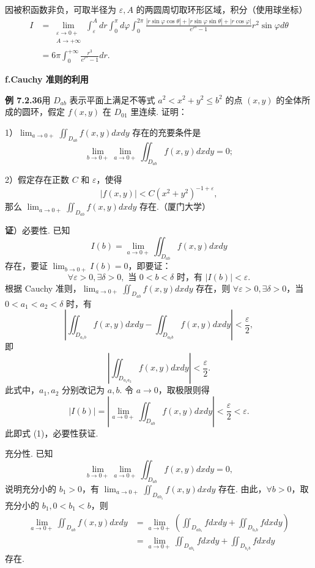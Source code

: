 \documentclass[UTF8,12pt,a4paper,fontset=fandol]{ctexart}
\begin{document}
因被积函数非负，可取半径为 $\varepsilon,A$ 的两圆周切取环形区域，积分（使用球坐标）
\[
\begin{aligned}
I&=\lim_{\substack{\varepsilon\to0+\\A\to+\infty}}
\int_\varepsilon^Adr\int_0^\pi d\varphi\int_0^{2\pi}
\frac{|r\sin\varphi\cos\theta|+|r\sin\varphi\sin\theta|+|r\cos\varphi|}
{e^{r^\alpha}-1}r^2\sin\varphi d\theta\\
&=6\pi\int_0^{+\infty}\frac{r^3}{e^{r^\alpha}-1}dr.
\end{aligned}
\]

\noindent\textbf{f.\quad Cauchy 准则的利用}

\noindent\textbf{例 7.2.36}\quad 用 $D_{ab}$ 表示平面上满足不等式 $a^2<x^2+y^2\le b^2$ 的点 $(x,y)$ 的全体所成的圆环，假定 $f(x,y)$ 在 $D_{01}$ 里连续. 证明：

1）$\displaystyle\lim_{a\to0+}\iint_{D_{ab}}f(x,y)dxdy$ 存在的充要条件是
\[
\lim_{b\to0+}\lim_{a\to0+}\iint_{D_{ab}}f(x,y)dxdy=0;
\]

2）假定存在正数 $C$ 和 $\varepsilon$，使得
\[
|f(x,y)|<C(x^2+y^2)^{-1+\varepsilon},
\]
那么 $\displaystyle\lim_{a\to0+}\iint_{D_{ab}}f(x,y)dxdy$ 存在.（厦门大学）

\noindent\textbf{证}）必要性. 已知
\[
I(b)=\lim_{a\to0+}\iint_{D_{ab}}f(x,y)dxdy
\]
存在，要证 $\lim_{b\to0+}I(b)=0$，即要证：
\[
\forall\varepsilon>0,\exists\delta>0,\text{ 当 }0<b<\delta\text{ 时，有 }|I(b)|<\varepsilon. \tag{1}
\]
根据 Cauchy 准则，$\displaystyle\lim_{a\to0+}\iint_{D_{ab}}f(x,y)dxdy$ 存在，则 $\forall\varepsilon>0,\exists\delta>0$，当 $0<a_1<a_2<\delta$ 时，有
\[
\left|\iint_{D_{a_1b}}f(x,y)dxdy-\iint_{D_{a_2b}}f(x,y)dxdy\right|<\frac\varepsilon2,
\]
即
\[
\left|\iint_{D_{a_1a_2}}f(x,y)dxdy\right|<\frac\varepsilon2.
\]
此式中，$a_1,a_2$ 分别改记为 $a,b$. 令 $a\to0$，取极限则得
\[
|I(b)|=\left|\lim_{a\to0+}\iint_{D_{ab}}f(x,y)dxdy\right|<\frac\varepsilon2<\varepsilon.
\]
此即式 (1)，必要性获证.

充分性. 已知
\[
\lim_{b\to0+}\lim_{a\to0+}\iint_{D_{ab}}f(x,y)dxdy=0,
\]
说明充分小的 $b_1>0$，有 $\displaystyle\lim_{a\to0+}\iint_{D_{ab_1}}f(x,y)dxdy$ 存在. 由此，$\forall b>0$，取充分小的 $b_1,0<b_1<b$，则
\[
\begin{aligned}
\lim_{a\to0+}\iint_{D_{ab}}f(x,y)dxdy
&=\lim_{a\to0+}\left(\iint_{D_{ab_1}}fdxdy+\iint_{D_{b_1b}}fdxdy\right)\\
&=\lim_{a\to0+}\iint_{D_{ab_1}}fdxdy+\iint_{D_{b_1b}}fdxdy
\end{aligned}
\]
存在.
\end{document}
